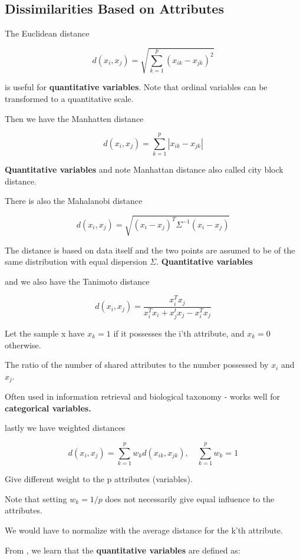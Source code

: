 \subsection{Dissimilarities Based on Attributes}

The Euclidean distance

\[
    d(x_i, x_j) = \sqrt{\sum_{k=1}^{p} (x_{ik} - x_{jk})^2}
\]

is useful for \textbf{quantitative variables}. Note that ordinal variables can be transformed to a quantitative scale. \cite[p.~11]{lecture7}

Then we have the Manhatten distance

\[
    d(x_i, x_j) = \sum_{k=1}^{p} |x_{ik} - x_{jk}|
\]

\textbf{Quantitative variables} and note Manhattan distance also called city block distance.

There is also the Mahalanobi distance

\[
    d(x_i, x_j) = \sqrt{(x_i - x_j)^T \Sigma^{-1}(x_i - x_j)}
\]

The distance is based on data itself and the two points are assumed
to be of the same distribution with equal dispersion $\Sigma$. \textbf{Quantitative variables}

and we also have the Tanimoto distance

\[
    d(x_i, x_j) = \frac{x_i^Tx_j}{x_i^T x_i + x_j^tx_j - x_i^T x_j}
\]

Let the sample x have $x_k = 1$ if it possesses the i'th attribute, and
$x_k = 0$ otherwise.

The ratio of the number of shared attributes to the number possessed
by $x_i$ and $x_j$.

Often used in information retrieval and biological taxonomy - works
well for \textbf{categorical variables.}

lastly we have weighted distances

\[
    d(x_i, x_j) = \sum_{k=1}^{p} w_k d(x_{ik}, x_{jk}), \quad \sum_{k=1}^{p} w_k =1
\]

Give different weight to the p attributes (variables).

Note that setting $w_k = 1/p$ does not necessarily give equal influence
to the attributes.

We would have to normalize with the average distance for the k'th
attribute.

From \cite[p.~504]{friedman2016elements}, we learn that the \textbf{quantitative variables} are defined as:\\

